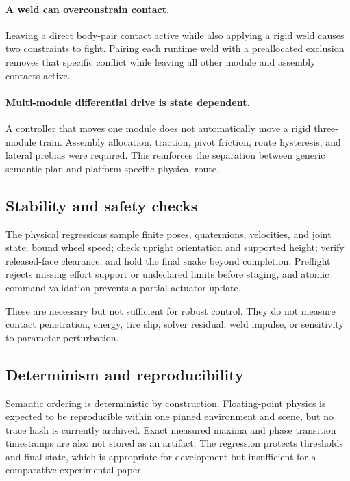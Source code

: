 \paragraph{A weld can overconstrain contact.}
Leaving a direct body-pair contact active while also applying a rigid weld causes two
constraints to fight. Pairing each runtime weld with a preallocated exclusion removes
that specific conflict while leaving all other module and assembly contacts active.

\paragraph{Multi-module differential drive is state dependent.}
A controller that moves one module does not automatically move a rigid three-module
train. Assembly allocation, traction, pivot friction, route hysteresis, and lateral
prebias were required. This reinforces the separation between generic semantic plan
and platform-specific physical route.

\subsection{Stability and safety checks}

The physical regressions sample finite poses, quaternions, velocities, and joint state;
bound wheel speed; check upright orientation and supported height; verify released-face
clearance; and hold the final snake beyond completion. Preflight rejects missing effort
support or undeclared limits before staging, and atomic command validation prevents a
partial actuator update.

These are necessary but not sufficient for robust control. They do not measure contact
penetration, energy, tire slip, solver residual, weld impulse, or sensitivity to
parameter perturbation.

\subsection{Determinism and reproducibility}

Semantic ordering is deterministic by construction. Floating-point physics is expected
to be reproducible within one pinned environment and scene, but no trace hash is
currently archived. Exact measured maxima and phase transition timestamps are also not
stored as an artifact. The regression protects thresholds and final state, which is
appropriate for development but insufficient for a comparative experimental paper.

